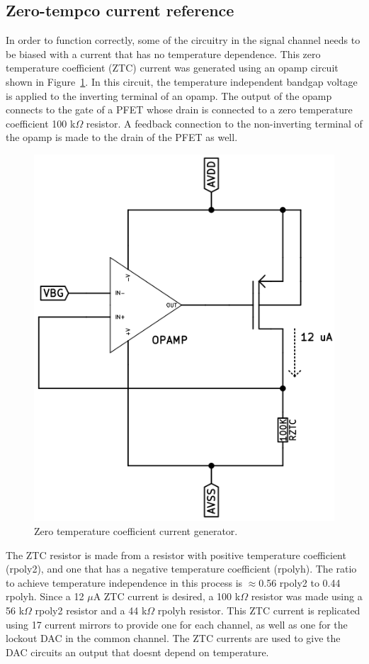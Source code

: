 \documentclass[12pt,oneside,final]{siuethesis}
\theoremstyle{definition}
\begin{document}
\subsection{Zero-tempco current reference}
\par In order to function correctly, some of the circuitry in the signal channel needs to be biased with a current that has no temperature dependence. This zero temperature coefficient (ZTC) current was generated using an opamp circuit shown in Figure~\ref{fig:ztc}. In this circuit, the temperature independent bandgap voltage is applied to the inverting terminal of an opamp. The output of the opamp connects to the gate of a PFET whose drain is connected to a zero temperature coefficient 100 k$\Omega$ resistor. A feedback connection to the non-inverting terminal of the opamp is made to the drain of the PFET as well. 
\begin{figure}[htbp!]
\centering
\includegraphics[scale=.45,keepaspectratio=true]{../../../images/ztc_gen.png} 
\caption{Zero temperature coefficient current generator.}
\label{fig:ztc}
\end{figure}
\par The ZTC resistor is made from a resistor with positive temperature coefficient (rpoly2), and one that has a negative temperature coefficient (rpolyh). The ratio to achieve temperature independence in this process is $\approx$0.56 rpoly2 to 0.44 rpolyh. Since a 12 $\mu$A ZTC current is desired, a 100 k$\Omega$ resistor was made using a 56 k$\Omega$ rpoly2 resistor and a 44 k$\Omega$ rpolyh resistor. This ZTC current is replicated using 17 current mirrors to provide one for each channel, as well as one for the lockout DAC in the common channel. The ZTC currents are used to give the DAC circuits an output that doesnt depend on temperature. 
\end{document}
